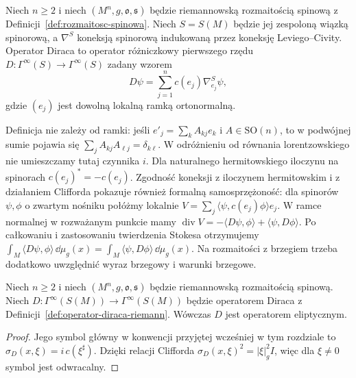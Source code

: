 \begin{definicja}
\label{def:operator-diraca-riemann}
Niech $n\geq2$ i niech $(M^n,g,\mathfrak o,\mathfrak s)$
będzie riemannowską rozmaitością spinową z
Definicji~\ref{def:rozmaitosc-spinowa}. Niech $S=S(M)$
będzie jej zespoloną wiązką spinorową, a $\nabla^S$
koneksją spinorową indukowaną przez koneksję
Leviego--Civity. Operator Diraca to operator różniczkowy
pierwszego rzędu $D:\Gamma^\infty(S)\to\Gamma^\infty(S)$
zadany wzorem
\begin{equation}\label{eq:dirac-riemann}
 D\psi=\sum_{j=1}^n c(e_j)\nabla^S_{e_j}\psi,
\end{equation}
gdzie $(e_j)$ jest dowolną lokalną ramką ortonormalną.
\end{definicja}

Definicja nie zależy od ramki: jeśli $e'_j=\sum_k A_{kj}e_k$
i $A\in\mathrm{SO}(n)$, to w podwójnej sumie
pojawia się $\sum_jA_{kj}A_{\ell j}=\delta_{k\ell}$.
W odróżnieniu od równania lorentzowskiego
nie umieszczamy tutaj czynnika $i$. Dla naturalnego
hermitowskiego iloczynu na spinorach $c(e_j)^*=-c(e_j)$.
Zgodność koneksji z iloczynem hermitowskim i
z działaniem Clifforda pokazuje również formalną
samosprzężoność: dla spinorów $\psi,\phi$ o zwartym
nośniku połóżmy lokalnie
$V=\sum_j\langle\psi,c(e_j)\phi\rangle e_j$.
W ramce normalnej w rozważanym punkcie mamy
$\operatorname{div}V=
-\langle D\psi,\phi\rangle+
\langle\psi,D\phi\rangle$.
Po całkowaniu i zastosowaniu twierdzenia Stokesa
otrzymujemy
$\int_M\langle D\psi,\phi\rangle\,\dd\mu_g(x)
=\int_M\langle\psi,D\phi\rangle\,\dd\mu_g(x)$.
Na rozmaitości z brzegiem trzeba dodatkowo uwzględnić
wyraz brzegowy i warunki brzegowe.

\begin{stwierdzenie}[Eliptyczność]
\label{prop:dirac-eliptycznosc}
Niech $n\geq2$ i niech $(M^n,g,\mathfrak o,\mathfrak s)$
będzie riemannowską rozmaitością spinową. Niech
$D:\Gamma^\infty(S(M))\to\Gamma^\infty(S(M))$
będzie operatorem Diraca z
Definicji~\ref{def:operator-diraca-riemann}.
Wówczas $D$ jest operatorem eliptycznym.
\end{stwierdzenie}
\begin{proof}
Jego symbol główny w konwencji przyjętej wcześniej
w tym rozdziale to $\sigma_D(x,\xi)=i\,c(\xi^\sharp)$.
Dzięki relacji Clifforda
$\sigma_D(x,\xi)^2=|\xi|_g^2I$, więc dla
$\xi\ne0$ symbol jest odwracalny.
\end{proof}

